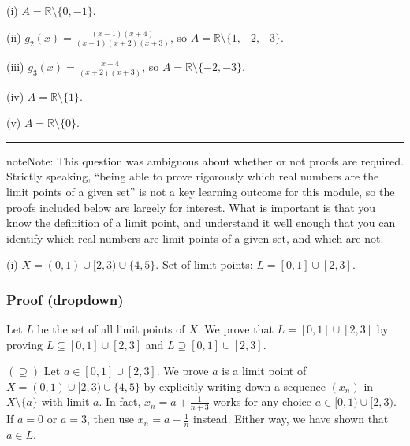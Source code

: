 \documentclass[letterpaper,10pt,english]{jupyterBook}
\begin{document}
\sphinxAtStartPar
(i) \(A=\mathbb{R} \setminus \{0, -1\}\).

\sphinxAtStartPar
(ii) \(g_{2}(x) = \displaystyle\frac{(x-1)(x+4)}{(x-1)(x+2)(x+3)}\), so \(A=\mathbb{R} \setminus \{1, -2, -3\}\).

\sphinxAtStartPar
(iii) \(g_{3}(x) = \displaystyle\frac{x+4}{(x+2)(x+3)}\), so \(A=\mathbb{R} \setminus \{-2, -3\}\).

\sphinxAtStartPar
(iv) \(A=\mathbb{R} \setminus \{1\}\).

\sphinxAtStartPar
(v) \(A=\mathbb{R} \setminus \{0\}\).


\bigskip\hrule\bigskip

\label{\detokenize{Solutions-upto46:id1}}
\sphinxAtStartPar
{\hyperref[\detokenize{Problems:id2}]{}} 

\begin{sphinxadmonition}{note}{Note:}
\sphinxAtStartPar
This question was ambiguous about whether or not proofs are required. Strictly speaking, “being able to prove rigorously which real numbers are the limit points of a given set” is not a key learning outcome for this module, so the proofs included below are largely for interest. What is important is that you know the definition of a limit point, and understand it well enough that you can identify which real numbers are limit points of a given set, and which are not.
\end{sphinxadmonition}

\sphinxAtStartPar
(i) \(X=(0,1)\cup[2,3)\cup\{4,5\}\). Set of limit points: \(L=[0,1]\cup[2,3]\).
\subsubsection*{Proof (dropdown)}

\sphinxAtStartPar
Let \(L\) be the set of all limit points of \(X\). We prove that \(L=[0,1]\cup[2,3]\) by proving \(L\subseteq[0,1]\cup[2,3]\) and \(L\supseteq[0,1]\cup[2,3]\).

\sphinxAtStartPar
\((\supseteq)\) Let \(a\in[0,1]\cup[2,3]\). We prove \(a\) is a limit point of \(X=(0,1)\cup[2,3)\cup\{4,5\}\) by explicitly writing down a sequence \((x_n)\) in \(X\setminus\{a\}\) with limit \(a\). In fact, \(x_n=a+\frac{1}{n+3}\) works for any choice \(a\in[0,1)\cup[2,3)\). If \(a=0\) or \(a=3\), then use \(x_n=a-\frac{1}{n}\) instead. Either way, we have shown that \(a\in L\).
\end{document}
